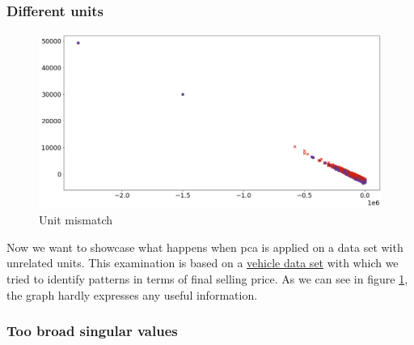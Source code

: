 

\subsubsection{Different units}

\begin{figure}[h]
    \centering
    \includegraphics[width=0.8\linewidth]{external_content/media/wrong_units/graph.png}
    \captionsetup{justification=centering}
    \caption{Unit mismatch}
    \label{fig:unitMismatch}
\end{figure}

\noindent
Now we want to showcase what happens when \gls{pca} is applied on a data set with unrelated units.
This examination is based on a \href{https://www.kaggle.com/nehalbirla/vehicle-dataset-from-cardekho?select=Car+details+v3.csv}{vehicle data set} with which we tried to identify patterns in terms of final selling price.
As we can see in figure \ref{fig:unitMismatch}, the graph hardly expresses any useful information.








\clearpage




\subsubsection{Too broad singular values}

